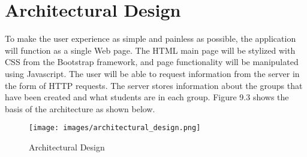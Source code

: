 \chapter{Architectural Design}
To make the user experience as simple and painless as possible, the application will function as a single Web page. The HTML main page will be stylized with CSS from the Bootstrap framework, and page functionality will be manipulated using Javascript. The user will be able to request information from the server in the form of HTTP requests. The server stores information about the groups that have been created and what students are in each group. Figure 9.3 shows the basis of the architecture as shown below.

\begin{figure}[h]
	\centering
	\texttt{[image: images/architectural\_design.png]}
	\caption{Architectural Design}
	\label{fig:architectural design}
\end{figure}